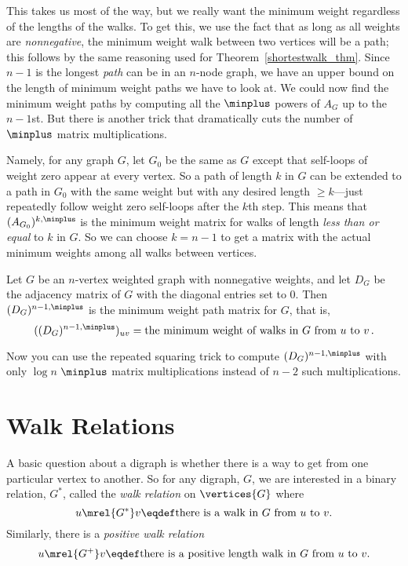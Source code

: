\begin{editingnotes}
This takes us most of the way, but we really want the minimum weight
regardless of the lengths of the walks.  To get this, we use the fact that
as long as all weights are \emph{nonnegative}, the minimum weight walk
between two vertices will be a path; this follows by the same reasoning
used for Theorem~\ref{shortestwalk_thm}.  Since $n-1$ is the longest \emph{path}
can be in an $n$-node graph, we have an upper bound on the length of
minimum weight paths we have to look at.  We could now find the minimum
weight paths by computing all the $\minplus$ powers of $A_G$ up to the
$n-1$st.  But there is another trick that dramatically cuts the number of
$\minplus$ matrix multiplications.

Namely, for any graph $G$, let $G_0$ be the same as $G$ except that
self-loops of weight zero appear at every vertex.  So a path of length $k$
in $G$ can be extended to a path in $G_0$ with the same weight but with
any desired length $ \geq k$---just repeatedly follow weight zero
self-loops after the $k$th step.  This means that $(A_{G_0})^{k, \minplus}$
is the minimum weight matrix for walks of length \emph{less than or equal}
to $k$ in $G$.  So we can choose $k = n-1$ to get a matrix with the
actual minimum weights among all walks between vertices.

\begin{theorem}\label{thm:minweightmatrix}
Let $G$ be an $n$-vertex weighted graph with nonnegative weights, and let
$D_G$ be the adjacency matrix of $G$ with the diagonal entries set to 0.
Then $(D_G)^{n-1, \minplus}$ is the minimum weight path matrix for $G$, that
is,
\[
((D_G)^{n-1, \minplus})_{uv} = \text{the minimum weight of walks in $G$ from
 $u$ to $v$}\,.
\]
\end{theorem}
Now you can use the repeated squaring trick to compute $(D_G)^{n-1,
  \minplus}$ with only $\log n$ $\minplus$ matrix multiplications
instead of $n-2$ such multiplications.

\end{editingnotes}

\section{Walk Relations}\label{walk_relation_sec}
A basic question about a digraph is whether there is a way to get from one
particular vertex to another.  So for any digraph, $G$, we are
interested in a binary relation, $G^*$, called the \emph{walk
  relation}%
 on $\vertices{G}$ where
\begin{equation}\label{G*def}
u \mrel{G^*} v \eqdef \mbox{there is a walk in $G$ from $u$ to $v$}.
\end{equation}
Similarly, there is a \emph{positive walk relation}
\begin{equation}\label{G+def}
u \mrel{G^+} v \eqdef \mbox{there is a positive length walk in $G$ from 
$u$ to $v$}.
\end{equation}

